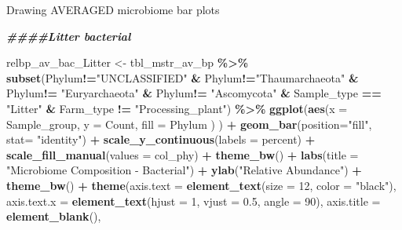 \documentclass[
]{article}
\newenvironment{Shaded}{\begin{snugshade}}{\end{snugshade}}
\newcommand{\AttributeTok}[1]{\textcolor[rgb]{0.13,0.29,0.53}{#1}}
\newcommand{\DecValTok}[1]{\textcolor[rgb]{0.00,0.00,0.81}{#1}}
\newcommand{\DocumentationTok}[1]{\textcolor[rgb]{0.56,0.35,0.01}{\textbf{\textit{#1}}}}
\newcommand{\FloatTok}[1]{\textcolor[rgb]{0.00,0.00,0.81}{#1}}
\newcommand{\FunctionTok}[1]{\textcolor[rgb]{0.13,0.29,0.53}{\textbf{#1}}}
\newcommand{\NormalTok}[1]{#1}
\newcommand{\OtherTok}[1]{\textcolor[rgb]{0.56,0.35,0.01}{#1}}
\newcommand{\SpecialCharTok}[1]{\textcolor[rgb]{0.81,0.36,0.00}{\textbf{#1}}}
\newcommand{\StringTok}[1]{\textcolor[rgb]{0.31,0.60,0.02}{#1}}
\begin{document}
Drawing AVERAGED microbiome bar plots

\begin{Shaded}
\begin{Highlighting}[]
\DocumentationTok{\#\#\#\#Litter bacterial}

\NormalTok{relbp\_av\_bac\_Litter }\OtherTok{\textless{}{-}} 
\NormalTok{tbl\_mstr\_av\_bp }\SpecialCharTok{\%\textgreater{}\%}
  \FunctionTok{subset}\NormalTok{(Phylum}\SpecialCharTok{!=}\StringTok{"UNCLASSIFIED"} \SpecialCharTok{\&}\NormalTok{ Phylum}\SpecialCharTok{!=}\StringTok{"Thaumarchaeota"} \SpecialCharTok{\&}\NormalTok{ Phylum}\SpecialCharTok{!=} \StringTok{"Euryarchaeota"} \SpecialCharTok{\&}\NormalTok{ Phylum}\SpecialCharTok{!=} \StringTok{"Ascomycota"} \SpecialCharTok{\&}\NormalTok{ Sample\_type }\SpecialCharTok{==} \StringTok{"Litter"}  \SpecialCharTok{\&}\NormalTok{ Farm\_type }\SpecialCharTok{!=} \StringTok{"Processing\_plant"}\NormalTok{) }\SpecialCharTok{\%\textgreater{}\%}
  \FunctionTok{ggplot}\NormalTok{(}\FunctionTok{aes}\NormalTok{(}\AttributeTok{x =}\NormalTok{ Sample\_group, }
             \AttributeTok{y =}\NormalTok{ Count, }
             \AttributeTok{fill =}\NormalTok{ Phylum}
\NormalTok{             )}
\NormalTok{         ) }\SpecialCharTok{+} 
  \FunctionTok{geom\_bar}\NormalTok{(}\AttributeTok{position=}\StringTok{"fill"}\NormalTok{, }\AttributeTok{stat=} \StringTok{"identity"}\NormalTok{) }\SpecialCharTok{+}
  \FunctionTok{scale\_y\_continuous}\NormalTok{(}\AttributeTok{labels =}\NormalTok{ percent) }\SpecialCharTok{+}
  \FunctionTok{scale\_fill\_manual}\NormalTok{(}\AttributeTok{values =}\NormalTok{ col\_phy) }\SpecialCharTok{+}
  \FunctionTok{theme\_bw}\NormalTok{() }\SpecialCharTok{+} 
  \FunctionTok{labs}\NormalTok{(}\AttributeTok{title =} \StringTok{"Microbiome Composition {-} Bacterial"}\NormalTok{) }\SpecialCharTok{+}
  \FunctionTok{ylab}\NormalTok{(}\StringTok{"Relative Abundance"}\NormalTok{) }\SpecialCharTok{+}
  \FunctionTok{theme\_bw}\NormalTok{() }\SpecialCharTok{+}
  \FunctionTok{theme}\NormalTok{(}\AttributeTok{axis.text =} \FunctionTok{element\_text}\NormalTok{(}\AttributeTok{size =} \DecValTok{12}\NormalTok{, }
                                 \AttributeTok{color =} \StringTok{"black"}\NormalTok{),}
        \AttributeTok{axis.text.x =} \FunctionTok{element\_text}\NormalTok{(}\AttributeTok{hjust =} \DecValTok{1}\NormalTok{,}
                                 \AttributeTok{vjust =} \FloatTok{0.5}\NormalTok{,}
                                 \AttributeTok{angle =} \DecValTok{90}\NormalTok{), }
        \AttributeTok{axis.title =} \FunctionTok{element\_blank}\NormalTok{(),}

\end{Highlighting}
\end{Shaded}
\end{document}
